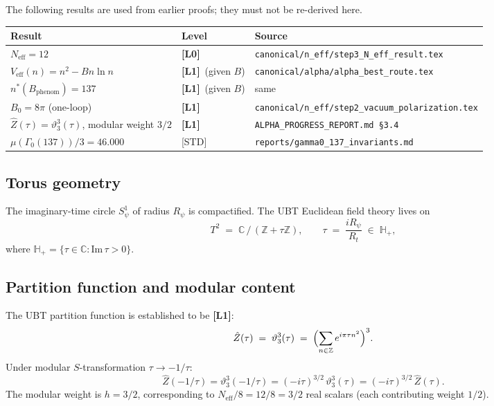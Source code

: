 \documentclass[12pt,a4paper]{article}
\theoremstyle{definition}
\theoremstyle{remark}
\newcommand{\Lzero}{\textbf{[L0]}}
\newcommand{\Lone}{\textbf{[L1]}}
\newcommand{\CC}{\mathbb{C}}
\newcommand{\ZZ}{\mathbb{Z}}
\newcommand{\vth}{\vartheta}
\begin{document}
The following results are used from earlier proofs; they must not be re-derived here.

\begin{tcolorbox}[colback=green!5!white,colframe=green!50!black,
  title={Pre-Proved Inputs (must not be re-derived)}]
\begin{center}
\begin{tabular}{lll}
\toprule
\textbf{Result} & \textbf{Level} & \textbf{Source} \\
\midrule
$N_{\mathrm{eff}} = 12$ & \Lzero & \texttt{canonical/n\_eff/step3\_N\_eff\_result.tex} \\
$V_{\mathrm{eff}}(n) = n^2 - Bn\ln n$ & \Lone\ (given $B$) & \texttt{canonical/alpha/alpha\_best\_route.tex} \\
$n^*(B_{\mathrm{phenom}}) = 137$ & \Lone\ (given $B$) & same \\
$B_0 = 8\pi$ (one-loop) & \Lone & \texttt{canonical/n\_eff/step2\_vacuum\_polarization.tex} \\
$\hat{Z}(\tau) = \vth_3^3(\tau)$, modular weight $3/2$ & \Lone & \texttt{ALPHA\_PROGRESS\_REPORT.md §3.4} \\
$\mu(\Gamma_0(137))/3 = 46.000$ & [STD] & \texttt{reports/gamma0\_137\_invariants.md} \\
\bottomrule
\end{tabular}
\end{center}
\end{tcolorbox}

\subsection{Torus geometry}

The imaginary-time circle $S^1_\psi$ of radius $R_\psi$ is compactified.
The UBT Euclidean field theory lives on
\[
  T^2 \;=\; \CC\,/\,(\ZZ + \tau\ZZ),
  \qquad
  \tau \;=\; \frac{iR_\psi}{R_t} \;\in\; \mathbb{H}_+,
\]
where $\mathbb{H}_+ = \{\tau \in \CC : \mathrm{Im}\,\tau > 0\}$.

\subsection{Partition function and modular content}

The UBT partition function is established to be \Lone:
\[
  \hat{Z}(\tau) \;=\; \vth_3^3(\tau)
  \;=\;
  \Bigl(\sum_{n\in\ZZ} e^{i\pi\tau n^2}\Bigr)^3.
\]
Under modular $S$-transformation $\tau \to -1/\tau$:
\[
  \hat{Z}(-1/\tau)
  = \vth_3^3(-1/\tau)
  = (-i\tau)^{3/2}\,\vth_3^3(\tau)
  = (-i\tau)^{3/2}\,\hat{Z}(\tau).
\]
The modular weight is $h = 3/2$, corresponding to $N_{\mathrm{eff}}/8 = 12/8 = 3/2$
real scalars (each contributing weight $1/2$).
\end{document}
